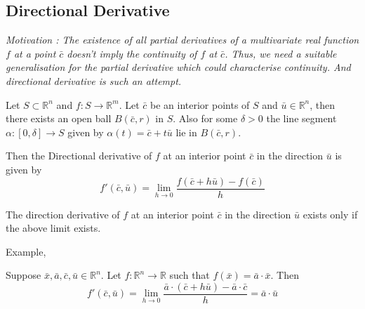 \subsection{Directional Derivative}
\textsl{Motivation : The existence of all partial derivatives of a multivariate real function $f$ at a point $\bar{c}$ doesn't imply the continuity of $f$ at $\bar{c}$.
	Thus, we need a suitable generalisation for the partial derivative which could characterise continuity.
	And directional derivative is such an attempt.}

\begin{definition}
	Let \(S \subset \mathbb{R}^n\) and \(f : S \to \mathbb{R}^m\).
	Let $\bar{c}$ be an interior points of $S$ and \( \bar{u} \in \mathbb{R}^n \), then there exists an open ball $B(\bar{c},r)$ in $S$.
	Also for some $\delta > 0$ the line segment \( \alpha : [0,\delta] \to S \) given by \( \alpha(t) = \bar{c}+t\bar{u} \) lie in $B(\bar{c},r)$.
	
	Then the Directional derivative of $f$ at an interior point $\bar{c}$ in the direction $\bar{u}$ is given by
	\[ f'(\bar{c},\bar{u}) = \lim_{h \to 0} \frac{f(\bar{c}+h\bar{u}) - f(\bar{c})}{h} \]
\end{definition}

\begin{remark}
	The direction derivative of $f$ at an interior point $\bar{c}$ in the direction $\bar{u}$ exists only if the above limit exists.
\end{remark}

\begin{remark}Example, \cite[Exercise 12.2a]{apostol}

Suppose \(\bar{x},\bar{a},\bar{c},\bar{u} \in \mathbb{R}^n\).
Let \(f : \mathbb{R}^n \to \mathbb{R}\) such that \(f(\bar{x}) = \bar{a}\cdot\bar{x}\).
Then \[ f'(\bar{c},\bar{u}) = \lim_{h \to 0} \frac{\bar{a}\cdot(\bar{c}+h\bar{u}) - \bar{a} \cdot \bar{c}}{h} = \bar{a} \cdot \bar{u}\]
\end{remark}


